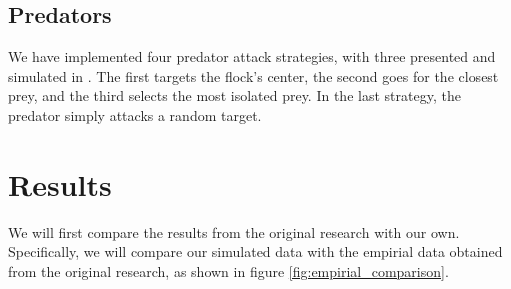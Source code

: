 \documentclass[9pt]{pnas-new}
\begin{document}
\subsection*{Predators}

We have implemented four predator attack strategies, with three presented and simulated in \cite{JDemsar_predator_attacks}.
The first targets the flock's center, the second goes for the closest prey, and the third selects the most isolated prey.
In the last strategy, the predator simply attacks a random target.

\section*{Results}

We will first compare the results from the original research \cite{papadopoulou2022emergence} with our own.
Specifically, we will compare our simulated data with the empirial data obtained from the original research, as shown in figure \ref{fig:empirial_comparison}.
\end{document}

